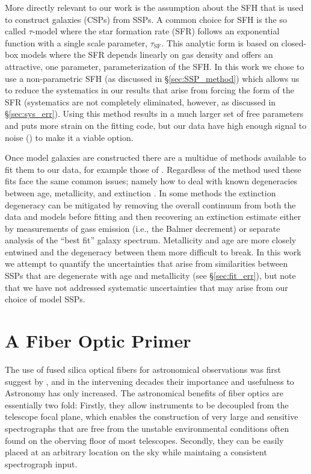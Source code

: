 More directly relevant to our work is the assumption about the SFH
that is used to construct galaxies (CSPs) from SSPs. A common choice
for SFH is the so called $\tau$-model where the star formation rate
(SFR) follows an exponential function with a single scale parameter,
$\tau_\mathrm{SF}$. This analytic form is based on closed-box models
where the SFR depends linearly on gas density \citep{Schmidt59} and
offers an attractive, one parameter, parameterization of the SFH. In
this work we chose to use a non-parametric SFH (as discussed in
\S\ref{sec:SSP_method}) which allows us to reduce the systematics in
our results that arise from forcing the form of the SFR (systematics
are not completely eliminated, however, as discussed in
\S\ref{sec:sys_err}). Using this method results in a much larger set
of free parameters and puts more strain on the fitting code, but our
data have high enough signal to noise () to
make it a viable option.

Once model galaxies are constructed there are a multidue of methods
available to fit them to our data, for example those of
\citep{Cappellari04,Tojeiro07,Chen12,CidFernandes05,Ocvirk06,Wilkinson15,Sanchez16}. Regardless
of the method used these fits face the same common issues; namely how
to deal with known degeneracies between age, metallicity, and
extinction \citep{Oconnel76,Aaronson78,Worthey94,dePaz02}. In some
methods the extinction degeneracy can be mitigated by removing the
overall continuum from both the data and models before fitting
\citep[e.g.,][]{Ocvirk06,Wilkinson15} and then recovering an
extinction estimate either by measurements of gass emission (i.e., the
Balmer decrement) or separate analysis of the ``best fit'' galaxy
spectrum. Metallicity and age are more closely entwined and the
degeneracy between them more difficult to break. In this work we
attempt to quantify the uncertainties that arise from similarities
between SSPs that are degenerate with age and metallicity (see
\S\ref{sec:fit_err}), but note that we have not addressed systematic
uncertainties that may arise from our choice of model SSPs.

\section{A Fiber Optic Primer}

The use of fused silica optical fibers for astronomical observations
was first suggest by \citet{Angel77}, and in the intervening decades
their importance and usefulness to Astronomy has only increased. The
astronomical benefits of fiber optics are essentially two fold:
Firstly, they allow instruments to be decoupled from the telescope
focal plane, which enables the construction of very large and
sensitive spectrographs that are free from the unstable environmental
conditions often found on the oberving floor of most
telescopes. Secondly, they can be easily placed at an arbitrary
location on the sky while maintaing a consistent spectrograph input.

